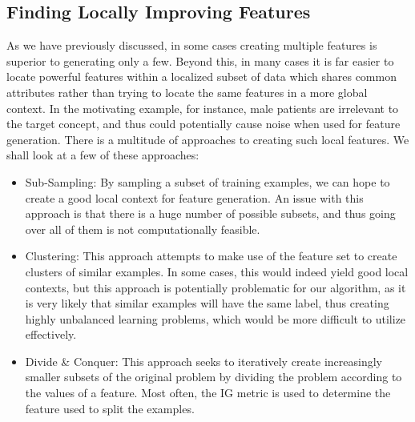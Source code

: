 \documentclass[twoside,11pt]{article}
\theoremstyle{definition}
\begin{document}

\subsection{Finding Locally Improving Features} \label{tree_usage}

As we have previously discussed, in some cases creating multiple features is superior to generating only a few. Beyond this, in many cases it is far easier to locate powerful features within a localized subset of data which shares common attributes rather than trying to locate the same features in a more global context. In the motivating example, for instance, male patients are irrelevant to the target concept, and thus could potentially cause noise when used for feature generation.
There is a multitude of approaches to creating such local features. We shall look at a few of these approaches:
\begin{itemize}
	\item Sub-Sampling: By sampling a subset of training examples, we can hope to create a good local context for feature generation. An issue with this approach is that there is a huge number of possible subsets, and thus going over all of them is not computationally feasible. 
	\item Clustering: This approach attempts to make use of the feature set to create clusters of similar examples. In some cases, this would indeed yield good local contexts, but this approach is potentially problematic for our algorithm, as it is very likely that similar examples will have the same label, thus creating highly unbalanced learning problems, which would be more difficult to utilize effectively.
	\item Divide \& Conquer: This approach seeks to iteratively create increasingly smaller subsets of the original problem by dividing the problem according to the values of a feature. Most often, the IG metric is used to determine the feature used to split the examples.
\end{itemize}
\end{document}
